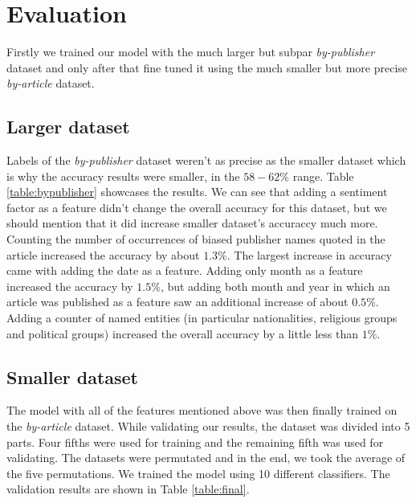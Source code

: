 \section{Evaluation}
\label{sec:feature}

Firstly we trained our model with the much larger but subpar \textit{by-publisher} dataset and only after that fine tuned it using the much smaller but more precise \textit{by-article} dataset. 

\subsection{Larger dataset}

Labels of the \textit{by-publisher} dataset weren't as precise as the smaller dataset which is why the accuracy results were smaller, in the $58-62\%$ range. Table \ref{table:bypublisher} showcases the results. We can see that adding a sentiment factor as a feature didn't change the overall accuracy for this dataset, but we should mention that it did increase smaller dataset's accuraccy much more. Counting the number of occurrences of biased publisher names quoted in the article increased the accuracy by about $1.3\%$. The largest increase in accuracy came with adding the date as a feature. Adding only month as a feature increased the accuracy by $1.5\%$, but adding both month and year in which an article was published as a feature saw an additional increase of about $0.5\%$. Adding a counter of named entities (in particular nationalities, religious groups and political groups) increased the overall accuracy by a little less than $1\%$. 



\subsection{Smaller dataset}
The model with all of the features mentioned above was then finally trained on the \textit{by-article} dataset. While validating our results, the dataset was divided into 5 parts. Four fifths were used for training and the remaining fifth was used for validating. The datasets were permutated and in the end, we took the average of the five permutations. We trained the model using 10 different classifiers. The validation results are shown in Table \ref{table:final}. 

